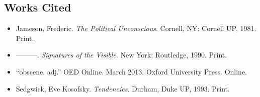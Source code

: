 \documentclass[
  12pt,
]{article}
\begin{document}
\hypertarget{works-cited}{%
\subsection{Works Cited}\label{works-cited}}

\begin{itemize}
\item
  Jameson, Frederic. \emph{The Political Unconscious}. Cornell, NY:
  Cornell UP, 1981. Print.
\item
  ---------. \emph{Signatures of the Visible}. New York: Routledge,
  1990. Print.
\item
  ``obscene, adj.'' OED Online. March 2013. Oxford University Press.
  Online.
\item
  Sedgwick, Eve Kosofsky. \emph{Tendencies}. Durham, Duke UP, 1993.
  Print.
\end{itemize}
\end{document}
